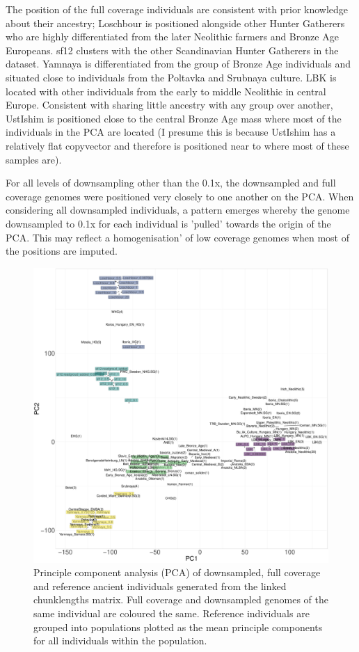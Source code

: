 The position of the full coverage individuals are consistent with prior knowledge about their ancestry; Loschbour is positioned alongside other Hunter Gatherers who are highly differentiated from the later Neolithic farmers and Bronze Age Europeans. sf12 clusters with the other Scandinavian Hunter Gatherers in the dataset. Yamnaya is differentiated from the group of Bronze Age individuals and situated close to individuals from the Poltavka and Srubnaya culture. LBK is located with other individuals from the early to middle Neolithic in central Europe. Consistent with sharing little ancestry with any group over another, UstIshim is positioned close to the central Bronze Age mass where most of the individuals in the PCA are located (I presume this is because UstIshim has a relatively flat copyvector and therefore is positioned near to where most of these samples are). 

For all levels of downsampling other than the 0.1x, the downsampled and full coverage genomes were positioned very closely to one another on the PCA. When considering all downsampled individuals, a pattern emerges whereby the genome downsampled to 0.1x for each individual is 'pulled' towards the origin of the PCA. This may reflect a homogenisation' of low coverage genomes when most of the positions are imputed.

\begin{figure}[htp]
    \centering
    \includegraphics[width=1.0\textwidth]{../images/chapter1/PCA_panel_allInds.allCoverage.pdf}
    \caption{Principle component analysis (PCA) of downsampled, full coverage and reference ancient individuals generated from the linked chunklengths matrix. Full coverage and downsampled genomes of the same individual are coloured the same. Reference individuals are grouped into populations plotted as the mean principle components for all individuals within the population.}
    \label{fig:PCA_panel_allInds_allCoverage}
\end{figure}

